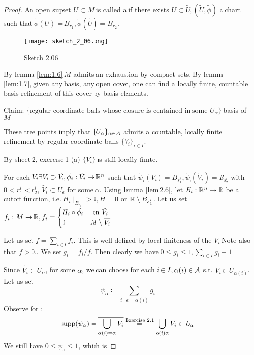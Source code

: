 \begin{proof} %
     An open supset \(U\subset M\) is called a  if there 
    exists \(\overline{U}\subset\tilde{U},(\tilde{U},\tilde{\phi})\) a chart such that 
    \(\tilde{\phi}(U)=B_{r_1},\tilde{\phi}(\tilde{U})=B_{r_2}\). 
    \begin{figure}[H]
        \centering
        \texttt{[image: sketch\_2\_06.png]}
        \caption{Sketch 2.06}
    \end{figure}
    By lemma \ref{lem:1.6} \(M\) admits an exhaustion by compact sets. By lemma \ref{lem:1.7}, given 
    any basis, any open cover, one can find a locally finite, countable basis refinement of this cover by basis elements.

    Claim: \(\{\text{regular coordinate balls whose closure is contained in some }U_\alpha\}\) basis of \(M\) 

    These tree points imply that \(\{U_\alpha\}_{\alpha\in\mathcal{A}}\) admits a countable, locally finite refinement by regular coordinate balls \(\{V_i\}_{i\in I}\).

    By sheet 2, exercise 1 (a) \(\{\overline{V_i}\}\) is still locally finite.

     For each \(V_i\exists V_i\supset \tilde{V_i},\tilde{\phi_i}:\tilde{V_i}\to \mathbb{R}^n\) such that 
    \(\tilde{\psi_i}(V_i)=B_{s_1^i},\tilde{\psi_i}(\tilde{V_i})=B_{s_2^i}\) with \(0<r_1^i<r_2^i\), \(\tilde{V_i}\subset U_\alpha\) for some \(\alpha\).
    Using lemma \ref{lem:2.6}, let \(H_i:\mathbb{R}^n\to \mathbb{R}\) be a cutoff function, i.e. \(H_i\mid_{{B_{r_1}}}>0,H=0\) on \(\mathbb{R}\setminus B_{s_1^i}\).
    Let us set \(f_i:M\to\mathbb{R}, f_i=\begin{cases}
        H_i\circ \tilde{\phi_i} & \text{ on } \tilde{V_i}\\
        0 & M\setminus \overline{{V_i}}
    \end{cases}\)

     Let us set \(f=\sum_{i\in I} f_i\). This is well defined by local finiteness of the \(\overline{V_i}\) Note also that \(f>0\)..
    We set \(g_i=f_i/f\). Then clearly we have \(0\leq g_i\leq 1, \sum_{i\in I} g_i\equiv 1\)

     Since \(\tilde{V_i}\subset U_\alpha\), for some \(\alpha\), we can choose for each \(i\in I, \alpha(i)\in \mathcal{A}\) s.t. \(V_i\in U_{\alpha(i)}\).
    Let us set \[\psi_{\alpha}\coloneqq \sum_{i\mid \alpha=\alpha(i)}g_i\]
    Observe for : \[\text{supp}(\psi_\alpha)=\overline{\bigcup_{\alpha(i)=\alpha} V_i}\stackrel{\text{Exercise 2.1}}{=}\bigcup_{\alpha(i)\alpha}\overline{V_i}\subset U_\alpha\]
    We still have \(0\leq \psi_\alpha\leq 1\), which is 
    

\end{proof}
